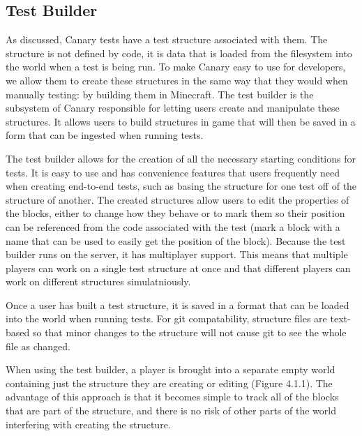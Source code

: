 \documentclass{article}
\begin{document}
\begin{onehalfspacing}
\subsection{Test Builder}

As discussed, Canary tests have a test structure associated with them.
The structure is not defined by code, it is data that is loaded from the
filesystem into the world when a test is being run. To make Canary easy
to use for developers, we allow them to create these structures in the
same way that they would when manually testing: by building them in
Minecraft. The test builder is the subsystem of Canary responsible for
letting users create and manipulate these structures. It allows users to
build structures in game that will then be saved in a form that can be
ingested when running tests.

The test builder allows for the creation of all the necessary starting
conditions for tests. It is easy to use and has convenience features
that users frequently need when creating end-to-end tests, such as
basing the structure for one test off of the structure of another. The
created structures allow users to edit the properties of the blocks,
either to change how they behave or to mark them so their position can
be referenced from the code associated with the test (mark a block with
a name that can be used to easily get the position of the block).
Because the test builder runs on the server, it has multiplayer support.
This means that multiple players can work on a single test structure at
once and that different players can work on different structures
simulatniously.

Once a user has built a test structure, it is saved in a format that can
be loaded into the world when running tests. For git compatability,
structure files are text-based so that minor changes to the structure
will not cause git to see the whole file as changed.

When using the test builder, a player is brought into a separate empty
world containing just the structure they are creating or editing (Figure
4.1.1). The advantage of this approach is that it becomes simple to
track all of the blocks that are part of the structure, and there is no
risk of other parts of the world interfering with creating the
structure.


\end{onehalfspacing}
\end{document}
